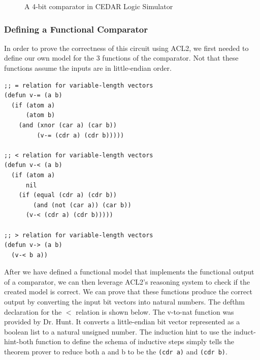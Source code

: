 \documentclass[fleqn,10pt]{SelfArx} %
\begin{document}
\begin{figure}[ht!]
  \caption{A 4-bit comparator in CEDAR Logic Simulator}
  {%
\setlength{\fboxsep}{0pt}%
\setlength{\fboxrule}{1pt}%
%
}%
\end{figure}

\subsubsection{Defining a Functional Comparator}
In order to prove the correctness of this circuit using ACL2, we first needed to define our own model for the 3 functions of the comparator. Not that these functions assume the inputs are in little-endian order. 

\begin{lstlisting}
;; = relation for variable-length vectors 
(defun v-= (a b)
  (if (atom a)
      (atom b)
    (and (xnor (car a) (car b))
         (v-= (cdr a) (cdr b)))))

;; < relation for variable-length vectors
(defun v-< (a b)
  (if (atom a)
      nil
    (if (equal (cdr a) (cdr b))
        (and (not (car a)) (car b))
      (v-< (cdr a) (cdr b)))))

;; > relation for variable-length vectors
(defun v-> (a b)
  (v-< b a))
\end{lstlisting}

After we have defined a functional model that implements the functional output of a comparator, we can then leverage ACL2's reasoning system to check if the created model is correct. We can prove that these functions produce the correct output by converting the input bit vectors into natural numbers. The defthm declaration for the $<$ relation is shown below. The v-to-nat function was provided by Dr. Hunt. It converts a little-endian bit vector represented as a boolean list to a natural unsigned number. The induction hint to use the induct-hint-both function to define the schema of inductive steps simply tells the theorem prover to reduce both a and b to be the 
\lstinline{(cdr a)} and \lstinline{(cdr b)}. 
\end{document}
